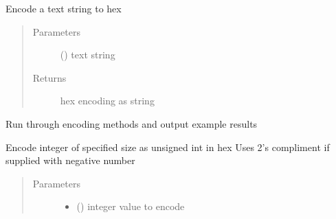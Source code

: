 \documentclass[letterpaper,10pt,english]{sphinxmanual}
\begin{document}
\begin{fulllineitems}
\begin{fulllineitems}
\end{fulllineitems}


\begin{fulllineitems}
\label{\detokenize{dhcp_encode-class:bloxone.dhcp_encode.string_to_hex}}
\sphinxAtStartPar
Encode a text string to hex
\begin{quote}\begin{description}
\item[{Parameters}] \leavevmode
\sphinxAtStartPar
{} () \textendash{} text string

\item[{Returns}] \leavevmode
\sphinxAtStartPar
hex encoding as string

\end{description}\end{quote}

\end{fulllineitems}


\begin{fulllineitems}
\label{\detokenize{dhcp_encode-class:bloxone.dhcp_encode.tests}}
\sphinxAtStartPar
Run through encoding methods and output example results

\end{fulllineitems}


\begin{fulllineitems}
\label{\detokenize{dhcp_encode-class:bloxone.dhcp_encode.uint_to_hex}}
\sphinxAtStartPar
Encode integer of specified size as unsigned int in hex
Uses 2’s compliment if supplied with negative number
\begin{quote}\begin{description}
\item[{Parameters}] \leavevmode\begin{itemize}
\item {} 
\sphinxAtStartPar
{} () \textendash{} integer value to encode


\end{itemize}
\end{description}
\end{quote}
\end{fulllineitems}
\end{fulllineitems}
\end{document}
